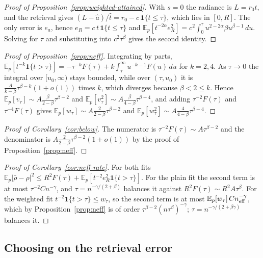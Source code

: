 \documentclass[11pt]{article}
\theoremstyle{remark}
\newcommand{\E}{\mathbb{E}}
\newcommand{\1}{\mathbf{1}}
\begin{document}
\begin{proof}[Proof of Proposition~\ref{prop:weighted-attained}]
With $s=0$ the radiance is $L=r_0t$, and the retrieval gives $(L-\hat a)/\hat t=r_0-c\,\1\{t\le\tau\}$, which lies in
$[0,R]$. The only error is $e_a$, hence $e_R=c\,t\,\1\{t\le\tau\}$ and
$\E_p[t^{-2\alpha}e_R^2]=c^2\int_0^\tau u^{2-2\alpha}\beta u^{\beta-1}\,du$. Solving for $\tau$ and substituting into
$c^2\tau^\beta$ gives the second identity.
\end{proof}

\begin{proof}[Proof of Proposition~\ref{prop:neff}]
Integrating by parts, $\E_p[t^{-k}\1\{t>\tau\}]=-\tau^{-k}F(\tau)+k\int_\tau^\infty u^{-k-1}F(u)\,du$ for $k=2,4$. As
$\tau\to0$ the integral over $[u_0,\infty)$ stays bounded, while over $(\tau,u_0)$ it is
$\frac{A}{k-\beta}\tau^{\beta-k}(1+o(1))$ times $k$, which diverges because $\beta<2\le k$. Hence
$\E_p[v_\tau]\sim A\frac{\beta}{2-\beta}\tau^{\beta-2}$ and $\E_p[v_\tau^2]\sim A\frac{\beta}{4-\beta}\tau^{\beta-4}$, and
adding $\tau^{-2}F(\tau)$ and $\tau^{-4}F(\tau)$ gives $\E_p[w_\tau]\sim A\frac{2}{2-\beta}\tau^{\beta-2}$ and
$\E_p[w_\tau^2]\sim A\frac{4}{4-\beta}\tau^{\beta-4}$.
\end{proof}

\begin{proof}[Proof of Corollary~\ref{cor:below}]
The numerator is $\tau^{-2}F(\tau)\sim A\tau^{\beta-2}$ and the denominator is $A\frac{2}{2-\beta}\tau^{\beta-2}(1+o(1))$
by the proof of Proposition~\ref{prop:neff}.
\end{proof}

\begin{proof}[Proof of Corollary~\ref{cor:neff-rate}]
For both fits $\E_p|\bar\rho-\rho|^2\le R^2F(\tau)+\E_p[t^{-2}e_R^2\1\{t>\tau\}]$. For the plain fit the second term is
at most $\tau^{-2}Cn^{-\gamma}$, and $\tau=n^{-\gamma/(2+\beta)}$ balances it against $R^2F(\tau)\sim R^2A\tau^\beta$.
For the weighted fit $t^{-2}\1\{t>\tau\}\le w_\tau$, so the second term is at most $\E_p[w_\tau]\,Cn_{\rm eff}^{-\gamma}$,
which by Proposition~\ref{prop:neff} is of order $\tau^{\beta-2}(n\tau^\beta)^{-\gamma}$; $\tau=n^{-\gamma/(2+\beta\gamma)}$
balances it.
\end{proof}

\subsection{Choosing on the retrieval error}
\end{document}
